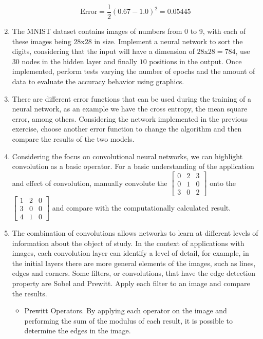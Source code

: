 \begin{enumerate}
$$
\text{Error}
=
\frac{1}{2}(0.67-1.0)^2=0.05445
$$


\item The MNIST dataset contains images of numbers from 0 to 9, with each of these images being $28$x$28$ in size. Implement a neural network to sort the digits, considering that the input will have a dimension of $28$x$28=784$, use $30$ nodes in the hidden layer and finally $10$ positions in the output. Once implemented, perform tests varying the number of epochs and the amount of data to evaluate the accuracy behavior using graphics.


\item There are different error functions that can be used during the training of a neural network, as an example we have the cross entropy, the mean square error, among others. Considering the network implemented in the previous exercise, choose another error function to change the algorithm and then compare the results of the two models.
\fi

\item \noindent Considering the focus on convolutional neural networks, we can highlight convolution as a basic operator. For a basic understanding of the application and effect of convolution, manually convolute the $\left[\begin{smallmatrix}
0 & 2 & 3\\
0 & 1 & 0\\
3 & 0 & 2
\end{smallmatrix}\right]$ onto the $\left[\begin{smallmatrix}
1 & 2 & 0\\
3 & 0 & 0\\
4 & 1 & 0
\end{smallmatrix}\right]$ and compare with the computationally calculated result. 


\item \noindent The combination of convolutions allows networks to learn at different levels of information about the object of study. In the context of applications with images, each convolution layer can identify a level of detail, for example, in the initial layers there are more general elements of the images, such as lines, edges and corners. Some filters, or convolutions, that have the edge detection property are Sobel and Prewitt. Apply each filter to an image and compare the results.


\begin{itemize}
\item Prewitt Operators. By applying each operator on the image and performing the sum of the modulus of each result, it is possible to determine the edges in the image.


\end{itemize}
\end{enumerate}
